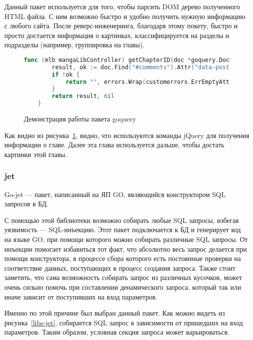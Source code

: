 Данный пакет используется для того, чтобы парсить DOM дерево полученного HTML файла. С ним возможно быстро и удобно получить нужную информацию с любого сайта.
После реверс-инженеринга, благодаря этому покету, быстро и просто достается информация о картинках, классифицируется на разделы и подразделы (например, группировка на главы).

\begin{figure}
	\begin{lstlisting}[language=go]
	func (mlb mangaLibController) getChapterID(doc *goquery.Document) (string, error) {
		result, ok := doc.Find("#comments").Attr("data-post-id")
		if !ok {
			return "", errors.Wrap(customerrors.ErrEmptyAttr, "mangalib: data-post-id")
		}
		return result, nil
	}
	\end{lstlisting}
	\caption{Демонстрация работы пакета goquery}
	\label{libs-goquery}
\end{figure}

Как видно из рисунка~\ref{libs-goquery}, видно, что используются команды jQuery для получения информации о главе. Далее эта глава используется дальше, чтобы достать картинки этой главы.

\subsubsection{jet}
Go-jet \cite{jet-cite} --- пакет, написанный на ЯП GO, являющийся конструктором SQL запросов в БД.

С помощью этой библиотеки возможно собирать любые SQL запросы, избегая уязвимость --- SQL-инъекцию. 
Этот пакет подключается к БД и генерирует код на языке GO, при помощи которого можно собирать различные SQL запросы.
От инъекции помогает избавиться тот факт, что абсолютно весь запрос делается при помощи конструктора, в процессе сбора которого есть постоянные проверки на соответствие данных,
поступающих в процесс создания запроса.
Также стоит заметить, что сама возможность собирать запрос из различных кусочков, может очень сильно помочь при составлении денамического запроса, который так или иначе зависит от поступивших на вход параметров.

Именно по этой причине был выбран данный пакет.
Как можно видеть из рисунка~\ref{libs-jet}, собирается SQL запрос в зависимости от пришедших на вход параметров. 
Таким образом, условная секция запроса может варьироваться.


